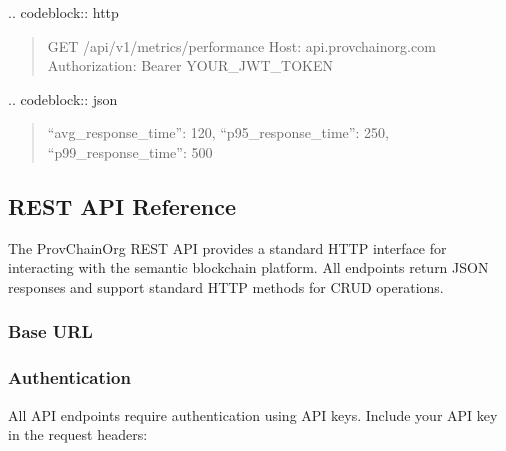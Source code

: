 \documentclass[letterpaper,10pt,english]{sphinxmanual}
\begin{document}
\sphinxAtStartPar
{}
.. code\sphinxhyphen{}block:: http
\begin{quote}

\sphinxAtStartPar
GET /api/v1/metrics/performance
Host: api.provchain\sphinxhyphen{}org.com
Authorization: Bearer YOUR\_JWT\_TOKEN
\end{quote}

\sphinxAtStartPar
{}
.. code\sphinxhyphen{}block:: json
\begin{quote}
\begin{description}
\sphinxlineitem{\{}\begin{description}
\begin{description}
\begin{description}
\sphinxAtStartPar
“avg\_response\_time”: 120,
“p95\_response\_time”: 250,
“p99\_response\_time”: 500

\end{description}

\end{description}

\end{description}

\end{description}
\end{quote}

\sphinxstepscope


\subsection{REST API Reference}
\label{\detokenize{api/rest-api:rest-api-reference}}\label{\detokenize{api/rest-api::doc}}
\sphinxAtStartPar
The ProvChainOrg REST API provides a standard HTTP interface for interacting with the semantic blockchain platform. All endpoints return JSON responses and support standard HTTP methods for CRUD operations.


\subsubsection{Base URL}
\label{\detokenize{api/rest-api:base-url}}
\sphinxAtStartPar
{}


\subsubsection{Authentication}
\label{\detokenize{api/rest-api:authentication}}
\sphinxAtStartPar
All API endpoints require authentication using API keys. Include your API key in the request headers:
\end{document}
